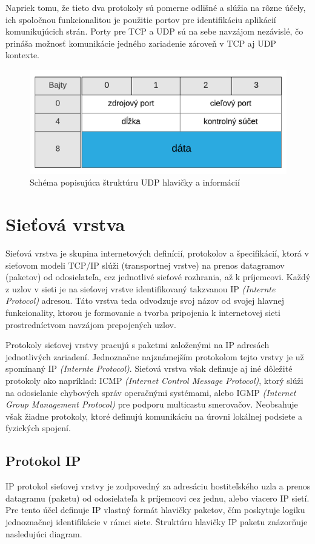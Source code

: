 \documentclass[
  digital, %
  table,   %
  lof,     %
  nolot,   %
  nocover
]{fithesis3}
\begin{document}
Napriek tomu, že tieto dva protokoly sú pomerne odlišné a slúžia na rôzne
účely, ich spoločnou funkcionalitou je použitie portov pre identifikáciu
aplikácií komunikujúcich strán. Porty pre TCP a UDP sú na sebe navzájom
nezávislé, čo prináša možnosť komunikácie jedného zariadenie zároveň v TCP aj
UDP kontexte.

\begin{figure}[H]
  \centering
    \includegraphics[width=.80\textwidth]{images/net-udp-head.png}
  \caption{Schéma popisujúca štruktúru UDP hlavičky a informácií}
  \label{fig:net-udp-head}
\end{figure}

\section{Sieťová vrstva}
Sieťová vrstva je skupina internetových definícií, protokolov a špecifikácií, ktorá
v sieťovom modeli TCP/IP slúži (transportnej vrstve) na prenos datagramov
(paketov) od odosielateľa, cez jednotlivé sieťové rozhrania, až k príjemcovi.
Každý z uzlov v sieti je na sieťovej vrstve identifikovaný takzvanou IP
\textit{(Internte Protocol)} adresou. Táto vrstva teda odvodzuje svoj názov od
svojej hlavnej funkcionality, ktorou je formovanie a tvorba pripojenia k
internetovej sieti prostredníctvom navzájom prepojených uzlov.

Protokoly sieťovej vrstvy pracujú s paketmi založenými na IP adresách
jednotlivých zariadení. Jednoznačne najznámejším protokolom tejto vrstvy je už
spomínaný IP \textit{(Internte Protocol)}. Sieťová vrstva však definuje aj iné
dôležité protokoly ako napríklad: ICMP
\textit{(Internet Control Message Protocol)}, ktorý slúži na odosielanie
chybových správ operačnými systémami, alebo IGMP
\textit{(Internet Group Management Protocol)} pre podporu multicastu smerovačov.
Neobsahuje však žiadne protokoly, ktoré definujú komunikáciu na
úrovni lokálnej podsiete a fyzických spojení.

\subsection{Protokol IP}
IP protokol sieťovej vrstvy je zodpovedný za adresáciu hostiteľského uzla a
prenos datagramu (paketu) od odosielateľa k príjemcovi cez jednu, alebo viacero
IP sietí. Pre tento účel definuje IP vlastný formát hlavičky paketov, čím
poskytuje logiku jednoznačnej identifikácie v rámci siete. Štruktúru hlavičky
IP paketu znázorňuje nasledujúci diagram.
\end{document}
